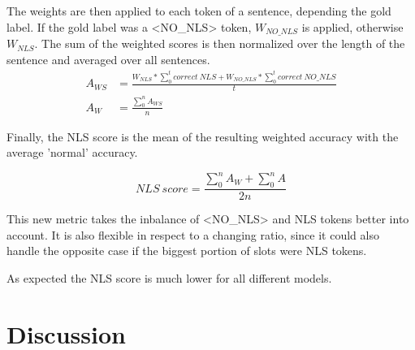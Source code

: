 \documentclass[
	11pt, %
]{fphw}
\begin{document}
The weights are then applied to each token of a sentence, depending the gold label. If the gold label was a <NO\_NLS> token, $W_{NO\_NLS}$ is applied, otherwise $W_{NLS}$. The sum of the weighted scores is then normalized over the length of the sentence and averaged over all sentences. 
\begin{align}
    A_{WS} &= \frac{W_{NLS} * \sum_{0}^{t}{correct\ NLS} + W_{NO\_NLS} *\sum_{0}^{t}{correct\ NO\_NLS}}{t} \\
    A_W &= \frac{\sum_{0}^{n}A_{WS}}{n}
\end{align}

Finally, the NLS score is the mean of the resulting weighted accuracy with the average 'normal' accuracy.

\begin{equation}
    NLS\ score = \frac{\sum_{0}^{n}{A_W} + \sum_{0}^{n}{A}}{2n}
\end{equation}

This new metric takes the inbalance of <NO\_NLS> and NLS tokens better into account. It is also flexible in respect to a changing ratio, since it could also handle the opposite case if the biggest portion of slots were NLS tokens.

As expected the NLS score is much lower for all different models.

\section*{Discussion}
\end{document}
